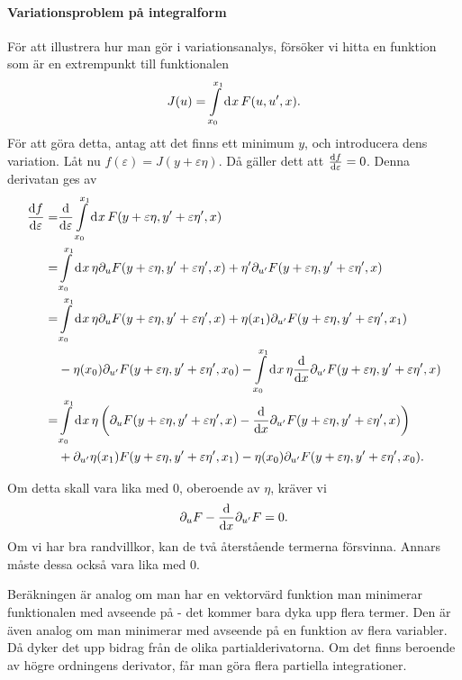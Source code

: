 \paragraph{Variationsproblem på integralform}
För att illustrera hur man gör i variationsanalys, försöker vi hitta en funktion som är en extrempunkt till funktionalen
\begin{align*}
	J(u) = \int\limits_{x_{0}}^{x_{1}}\dd[]{x}F(u, u', x).
\end{align*}
För att göra detta, antag att det finns ett minimum $y$, och introducera dens variation. Låt nu $f(\varepsilon) = J(y + \varepsilon\eta)$. Då gäller dett att $\dv{f}{\varepsilon} (0) = 0$. Denna derivatan ges av
\begin{align*}
	\dv{f}{\varepsilon} (\varepsilon) =& \dv{\varepsilon}\int\limits_{x_{0}}^{x_{1}}\dd[]{x}F(y + \varepsilon\eta, y' + \varepsilon\eta', x) \\
	                                  =& \int\limits_{x_{0}}^{x_{1}}\dd[]{x}\eta\partial_{u}F(y + \varepsilon\eta, y' + \varepsilon\eta', x) + \eta'\partial_{u'}F(y + \varepsilon\eta, y' + \varepsilon\eta', x) \\
	                                  =& \int\limits_{x_{0}}^{x_{1}}\dd[]{x}\eta\partial_{u}F(y + \varepsilon\eta, y' + \varepsilon\eta', x) + \eta(x_{1})\partial_{u'}F(y + \varepsilon\eta, y' + \varepsilon\eta', x_{1}) \\
	                                   &- \eta(x_{0})\partial_{u'}F(y + \varepsilon\eta, y' + \varepsilon\eta', x_{0}) - \int\limits_{x_{0}}^{x_{1}}\dd[]{x}\eta\dv{x}\partial_{u'}F(y + \varepsilon\eta, y' + \varepsilon\eta', x) \\
	                                  =& \int\limits_{x_{0}}^{x_{1}}\dd[]{x}\eta\left(\partial_{u}F(y + \varepsilon\eta, y' + \varepsilon\eta', x) - \dv{x}\partial_{u'}F(y + \varepsilon\eta, y' + \varepsilon\eta', x)\right) \\
	                                   &+ \partial_{u'}\eta(x_{1})F(y + \varepsilon\eta, y' + \varepsilon\eta', x_{1}) - \eta(x_{0})\partial_{u'}F(y + \varepsilon\eta, y' + \varepsilon\eta', x_{0}).
\end{align*}

Om detta skall vara lika med $0$, oberoende av $\eta$, kräver vi
\begin{align*}
	\partial_{u}F - \dv{x}\partial_{u'}F = 0.
\end{align*}
Om vi har bra randvillkor, kan de två återstående termerna försvinna. Annars måste dessa också vara lika med $0$.

Beräkningen är analog om man har en vektorvärd funktion man minimerar funktionalen med avseende på - det kommer bara dyka upp flera termer. Den är även analog om man minimerar med avseende på en funktion av flera variabler. Då dyker det upp bidrag från de olika partialderivatorna. Om det finns beroende av högre ordningens derivator, får man göra flera partiella integrationer.

